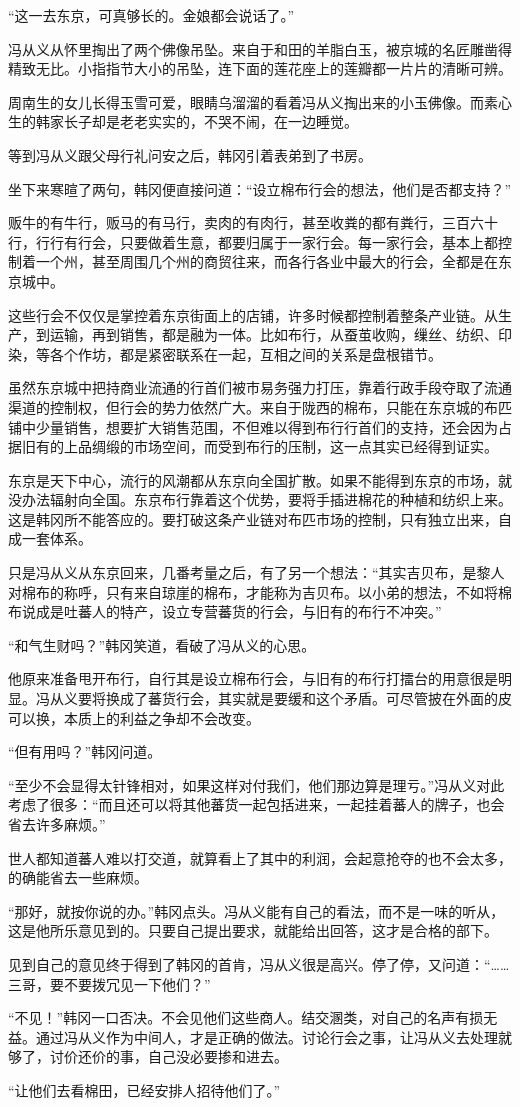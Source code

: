 “这一去东京，可真够长的。金娘都会说话了。”

冯从义从怀里掏出了两个佛像吊坠。来自于和田的羊脂白玉，被京城的名匠雕凿得精致无比。小指指节大小的吊坠，连下面的莲花座上的莲瓣都一片片的清晰可辨。

周南生的女儿长得玉雪可爱，眼睛乌溜溜的看着冯从义掏出来的小玉佛像。而素心生的韩家长子却是老老实实的，不哭不闹，在一边睡觉。

等到冯从义跟父母行礼问安之后，韩冈引着表弟到了书房。

坐下来寒暄了两句，韩冈便直接问道：“设立棉布行会的想法，他们是否都支持？”

贩牛的有牛行，贩马的有马行，卖肉的有肉行，甚至收粪的都有粪行，三百六十行，行行有行会，只要做着生意，都要归属于一家行会。每一家行会，基本上都控制着一个州，甚至周围几个州的商贸往来，而各行各业中最大的行会，全都是在东京城中。

这些行会不仅仅是掌控着东京街面上的店铺，许多时候都控制着整条产业链。从生产，到运输，再到销售，都是融为一体。比如布行，从蚕茧收购，缫丝、纺织、印染，等各个作坊，都是紧密联系在一起，互相之间的关系是盘根错节。

虽然东京城中把持商业流通的行首们被市易务强力打压，靠着行政手段夺取了流通渠道的控制权，但行会的势力依然广大。来自于陇西的棉布，只能在东京城的布匹铺中少量销售，想要扩大销售范围，不但难以得到布行行首们的支持，还会因为占据旧有的上品绸缎的市场空间，而受到布行的压制，这一点其实已经得到证实。

东京是天下中心，流行的风潮都从东京向全国扩散。如果不能得到东京的市场，就没办法辐射向全国。东京布行靠着这个优势，要将手插进棉花的种植和纺织上来。这是韩冈所不能答应的。要打破这条产业链对布匹市场的控制，只有独立出来，自成一套体系。

只是冯从义从东京回来，几番考量之后，有了另一个想法：“其实吉贝布，是黎人对棉布的称呼，只有来自琼崖的棉布，才能称为吉贝布。以小弟的想法，不如将棉布说成是吐蕃人的特产，设立专营蕃货的行会，与旧有的布行不冲突。”

“和气生财吗？”韩冈笑道，看破了冯从义的心思。

他原来准备甩开布行，自行其是设立棉布行会，与旧有的布行打擂台的用意很是明显。冯从义要将换成了蕃货行会，其实就是要缓和这个矛盾。可尽管披在外面的皮可以换，本质上的利益之争却不会改变。

“但有用吗？”韩冈问道。

“至少不会显得太针锋相对，如果这样对付我们，他们那边算是理亏。”冯从义对此考虑了很多：“而且还可以将其他蕃货一起包括进来，一起挂着蕃人的牌子，也会省去许多麻烦。”

世人都知道蕃人难以打交道，就算看上了其中的利润，会起意抢夺的也不会太多，的确能省去一些麻烦。

“那好，就按你说的办。”韩冈点头。冯从义能有自己的看法，而不是一味的听从，这是他所乐意见到的。只要自己提出要求，就能给出回答，这才是合格的部下。

见到自己的意见终于得到了韩冈的首肯，冯从义很是高兴。停了停，又问道：“……三哥，要不要拨冗见一下他们？”

“不见！”韩冈一口否决。不会见他们这些商人。结交溷类，对自己的名声有损无益。通过冯从义作为中间人，才是正确的做法。讨论行会之事，让冯从义去处理就够了，讨价还价的事，自己没必要掺和进去。

“让他们去看棉田，已经安排人招待他们了。”

